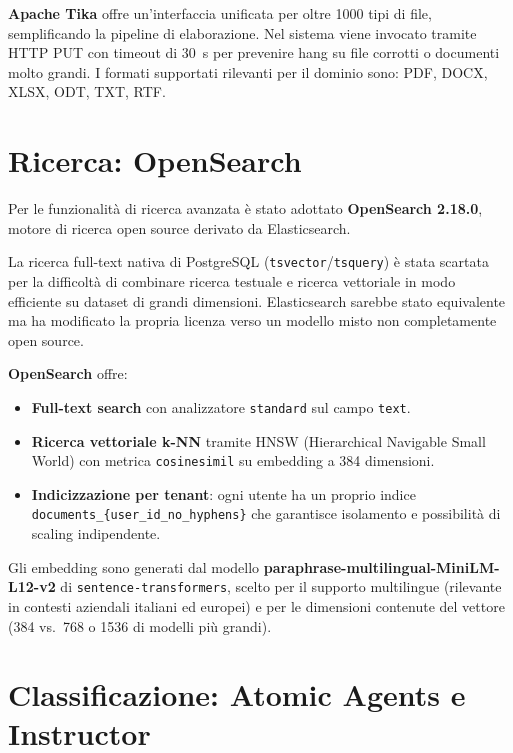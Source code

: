 \textbf{Apache Tika} offre un'interfaccia unificata per oltre 1000 tipi di file,
semplificando la pipeline di elaborazione. Nel sistema viene invocato tramite HTTP PUT
con timeout di 30~s per prevenire hang su file corrotti o documenti molto grandi. I formati
supportati rilevanti per il dominio sono: PDF, DOCX, XLSX, ODT, TXT, RTF.

\section{Ricerca: OpenSearch}
\label{sec:stack_opensearch}

Per le funzionalit\`a di ricerca avanzata \`e stato adottato \textbf{OpenSearch 2.18.0},
motore di ricerca open source derivato da Elasticsearch.

La ricerca full-text nativa di PostgreSQL (\texttt{tsvector}/\texttt{tsquery}) \`e stata
scartata per la difficolt\`a di combinare ricerca testuale e ricerca vettoriale in modo
efficiente su dataset di grandi dimensioni. Elasticsearch sarebbe stato equivalente ma
ha modificato la propria licenza verso un modello misto non completamente open source.

\textbf{OpenSearch} offre:
\begin{itemize}[leftmargin=*]
    \item \textbf{Full-text search} con analizzatore \texttt{standard} sul campo \texttt{text}.
    \item \textbf{Ricerca vettoriale k-NN} tramite \textsc{HNSW} (Hierarchical Navigable
          Small World) con metrica \texttt{cosinesimil} su embedding a 384 dimensioni.
    \item \textbf{Indicizzazione per tenant}: ogni utente ha un proprio indice
          \texttt{documents\_\{user\_id\_no\_hyphens\}} che garantisce isolamento e
          possibilit\`a di scaling indipendente.
\end{itemize}

Gli embedding sono generati dal modello
\textbf{paraphrase-multilingual-MiniLM-L12-v2} di \texttt{sentence-transformers},
scelto per il supporto multilingue (rilevante in contesti aziendali italiani ed europei)
e per le dimensioni contenute del vettore (384 vs.\ 768 o 1536 di modelli pi\`u grandi).

\section{Classificazione: Atomic Agents e Instructor}
\label{sec:stack_agent}


